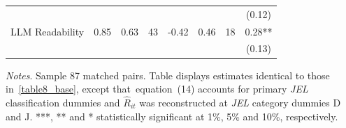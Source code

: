 \begin{table}[H]
\begin{threeparttable}
\begin{tabular}{p{3cm}S[table-format=3.3]@{}S[table-format=3.3]@{}S[table-format=3.2]@{}S[table-format=4.3]@{}S[table-format=3.3]@{}S[table-format=3.1]@{}S@{}}
                                          &            &            &            &            &            &            &      (0.12)   \\
            LLM Readability               &        0.85&        0.63&          43&       -0.42&        0.46&          18&        0.28** \\
                                          &            &            &            &            &            &            &      (0.13)   \\
            \bottomrule
        \end{tabular}
        \begin{tablenotes}
            \tiny
            \item \textit{Notes}. Sample 87 matched pairs. Table displays estimates identical to those in~\autoref{table8_base}, except that~equation~(14) accounts for primary \textit{JEL} classification dummies and \(\widehat R_{it}\) was reconstructed at \textit{JEL} category dummies D and J. ***, ** and * statistically significant at 1\%, 5\% and 10\%, respectively.
        \end{tablenotes}
    \end{threeparttable}
\end{table}